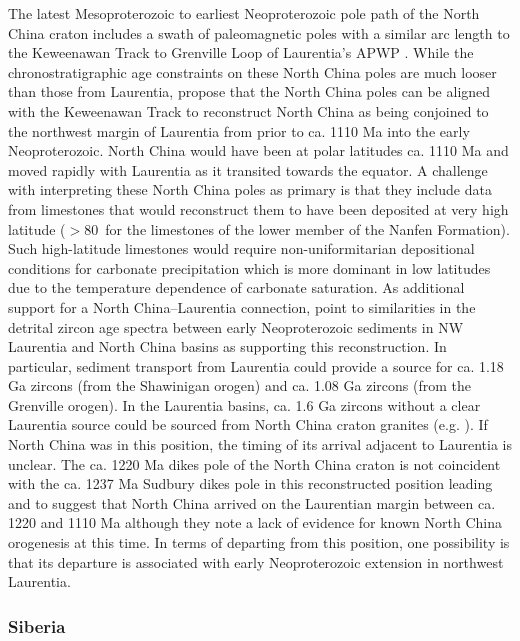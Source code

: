\documentclass[twocolumn, switch]{article} %
\begin{document}
The latest Mesoproterozoic to earliest Neoproterozoic pole path of the North China craton includes a swath of paleomagnetic poles with a similar arc length to the Keweenawan Track to Grenville Loop of Laurentia's APWP \citep{Zhao2019a, Zhang2021a}. While the chronostratigraphic age constraints on these North China poles are much looser than those from Laurentia, \cite{Zhao2019a} propose that the North China poles can be aligned with the Keweenawan Track to reconstruct North China as being conjoined to the northwest margin of Laurentia from prior to ca. 1110 Ma into the early Neoproterozoic. North China would have been at polar latitudes ca. 1110 Ma and moved rapidly with Laurentia as it transited towards the equator. A challenge with interpreting these North China poles as primary is that they include data from limestones that would reconstruct them to have been deposited at very high latitude ($>$80\textdegree\ for the limestones of the lower member of the Nanfen Formation). Such high-latitude limestones would require non-uniformitarian depositional conditions for carbonate precipitation which is more dominant in low latitudes due to the temperature dependence of carbonate saturation. As additional support for a North China--Laurentia connection, \cite{Zhao2019a} point to similarities in the detrital zircon age spectra between early Neoproterozoic sediments in NW Laurentia and North China basins as supporting this reconstruction. In particular, sediment transport from Laurentia could provide a source for ca. 1.18 Ga zircons (from the Shawinigan orogen) and ca. 1.08 Ga zircons (from the Grenville orogen). In the Laurentia basins, ca. 1.6 Ga zircons without a clear Laurentia source could be sourced from North China craton granites (e.g. \citealp{Wang2020a}). If North China was in this position, the timing of its arrival adjacent to Laurentia is unclear. The ca. 1220 Ma dikes pole of the North China craton is not coincident with the ca. 1237 Ma Sudbury dikes pole in this reconstructed position leading \cite{Zhao2019a} and \cite{Zhang2021a} to suggest that North China arrived on the Laurentian margin between ca. 1220 and 1110 Ma although they note a lack of evidence for known North China orogenesis at this time. In terms of departing from this position, one possibility is that its departure is associated with early Neoproterozoic extension in northwest Laurentia.


\subsubsection{Siberia}
\end{document}
